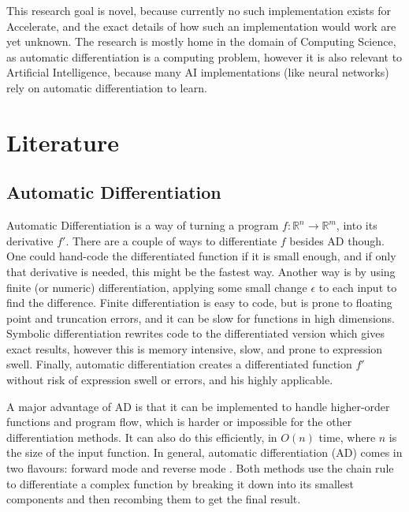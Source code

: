 \documentclass{article}
\begin{document}
        This research goal is novel, because currently no such implementation exists for Accelerate, and the exact details of how such an implementation would work are yet unknown.
        The research is mostly home in the domain of Computing Science, as automatic differentiation is a computing problem, however it is also relevant to Artificial Intelligence, because many AI implementations (like neural networks) rely on automatic differentiation to learn.

    \section{Literature} \label{sec:literature}
        \subsection{Automatic Differentiation}
            Automatic Differentiation is a way of turning a program $f:\mathbb{R}^n\to\mathbb{R}^m$, into its derivative $f'$.
            There are a couple of ways to differentiate $f$ besides AD though.
            One could hand-code the differentiated function if it is small enough, and if only that derivative is needed, this might be the fastest way.
            Another way is by using finite (or numeric) differentiation, applying some small change $\epsilon$ to each input to find the difference.
            Finite differentiation is easy to code, but is prone to floating point and truncation errors, and it can be slow for functions in high dimensions.
            Symbolic differentiation rewrites code to the differentiated version which gives exact results, however this is memory intensive, slow, and prone to expression swell.
            Finally, automatic differentiation creates a differentiated function $f'$ without risk of expression swell or errors, and his highly applicable.

            A major advantage of AD is that it can be implemented to handle higher-order functions and program flow, which is harder or impossible for the other differentiation methods.
            It can also do this efficiently, in $O(n)$ time, where $n$ is the size of the input function.
            In general, automatic differentiation (AD) comes in two flavours: forward mode and reverse mode \cite{margossian2019review, elliot2018essence}.
            Both methods use the chain rule to differentiate a complex function by breaking it down into its smallest components and then recombing them to get the final result.
\end{document}
